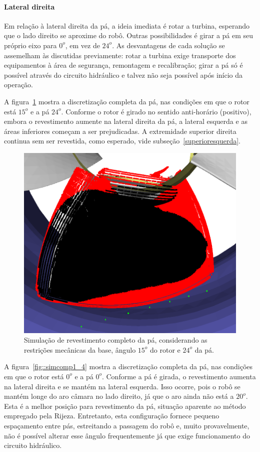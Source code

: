 \paragraph{Lateral direita}
Em relação à lateral direita da pá, a ideia imediata é rotar a turbina,
esperando que o lado direito se aproxime do robô. Outras possibilidades é
girar a pá em seu próprio eixo para $0^o$, em vez de $24^o$. As desvantagens de
cada solução se assemelham às discutidas previamente: rotar a turbina exige
transporte dos equipamentos à área de segurança, remontagem e recalibração;
girar a pá só é possível através do circuito hidráulico e talvez não seja
possível após início da operação.

A figura~\ref{fig::simcomp1_2} mostra a discretização completa da pá, nas
condições em que o rotor está $15^o$ e a pá $24^o$. Conforme o rotor é
girado no sentido anti-horário (positivo), embora o revestimento aumente na
lateral direita da pá, a lateral esquerda e as áreas inferiores começam a ser
prejudicadas. A extremidade superior direita continua sem ser revestida, como
esperado, vide subseção~\ref{superioresquerda}.

\begin{figure}[!ht]
	\centering	
	\includegraphics[width=.5\columnwidth]{figs/simcomp1_2.png}
	\caption{Simulação de revestimento completo da pá, considerando as
	restrições mecânicas da base, ângulo $15^o$ do rotor e $24^o$ da pá.}
	\label{fig::simcomp1_2}
\end{figure}

A figura~\ref{fig::simcomp1_4} mostra a discretização completa da pá, nas
condições em que o rotor está $0^o$ e a pá $0^o$. Conforme a pá é girada, o
revestimento aumenta na lateral direita e se mantém na lateral esquerda. Isso
ocorre, pois o robô se mantém longe do aro câmara no lado direito, já que o aro
ainda não está a $20^o$. Esta é a melhor posição para revestimento da pá,
situação aparente ao método empregado pela Rijeza. Entretanto, esta configuração
fornece pequeno espaçamento entre pás, estreitando a passagem do robô e, muito
provavelmente, não é possível alterar esse ângulo frequentemente já que exige
funcionamento do circuito hidráulico.

